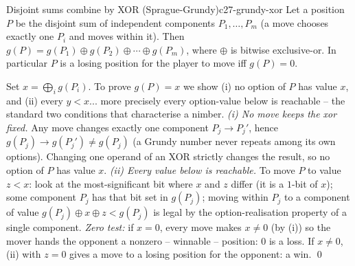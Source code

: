 \begin{theorem}{Disjoint sums combine by XOR (Sprague-Grundy)}{c27-grundy-xor}
Let a position $P$ be the disjoint sum of independent components $P_1, \dots, P_m$
(a move chooses exactly one $P_i$ and moves within it). Then
$g(P) = g(P_1) \oplus g(P_2) \oplus \cdots \oplus g(P_m)$, where $\oplus$ is
bitwise exclusive-or. In particular $P$ is a losing position for the player to move
iff $g(P) = 0$.
\end{theorem}
\begin{proofbox}
Set $x = \bigoplus_i g(P_i)$. To prove $g(P) = x$ we show (i) no option of $P$ has
value $x$, and (ii) every $y < x$... more precisely every option-value below is
reachable -- the standard two conditions that characterise a nimber. \emph{(i) No move
keeps the xor fixed.} Any move changes exactly one component $P_j \to P_j'$, hence
$g(P_j) \to g(P_j') \ne g(P_j)$ (a Grundy number never repeats among its own options).
Changing one operand of an XOR strictly changes the result, so no option of $P$ has
value $x$. \emph{(ii) Every value below is reachable.} To move $P$ to value $z < x$:
look at the most-significant bit where $x$ and $z$ differ (it is a $1$-bit of $x$);
some component $P_j$ has that bit set in $g(P_j)$; moving within $P_j$ to a component
of value $g(P_j) \oplus x \oplus z < g(P_j)$ is legal by the option-realisation property
of a single component. \emph{Zero test:} if $x = 0$, every move makes $x \ne 0$ (by (i))
so the mover hands the opponent a nonzero -- winnable -- position: $0$ is a loss. If
$x \ne 0$, (ii) with $z = 0$ gives a move to a losing position for the opponent: a win.
\qed
\end{proofbox}

